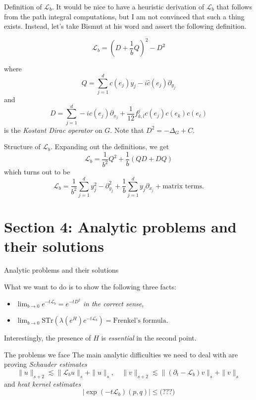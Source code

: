 \documentclass{beamer}
\numberwithin{equation}{section}
\theoremstyle{plain}
\theoremstyle{plain}
\theoremstyle{definition}
\theoremstyle{plain}
\theoremstyle{plain}
\theoremstyle{definition}
\newcommand{\Lc}{\mathcal{L}}
\newcommand{\Str}{\mathrm{STr}}
\begin{document}
\begin{frame}{Definition of $\Lc_b.$}
  It would be nice to have a heuristic derivation of $\Lc_b$ that follows from the path integral computations, but I am not convinced that such a thing exists. Instead, let's take Bismut at his word and assert the following definition.
  \begin{definition}
    \[
      \Lc_b = (D+\frac1bQ)^2-D^2
    \]
  \end{definition}
  where
  \[
    Q = \sum_{j=1}^d c(e_j)y_j-i\widehat{c}(e_j)\partial_{y_j}
  \]
  and 
  \[
    D = \sum_{j=1}^d -ic(e_j)\partial_{x_j}+\frac{1}{12}f^j_{k,l}c(e_j)c(e_k)c(e_\ell)
  \]
  is the \emph{Kostant Dirac operator} on $G.$ Note that $D^2  =-\Delta_G+C.$
\end{frame}

\begin{frame}{Structure of $\Lc_b.$}
  Expanding out the definitions, we get
  \[
    \Lc_b = \frac{1}{b^2}Q^2+\frac{1}{b}(QD+DQ)
  \]
  which turns out to be
  \[
    \Lc_b = \frac{1}{b^2}\sum_{j=1}^d y_j^2-\partial_{y_j}^2 + \frac{1}{b}\sum_{j=1}^dy_j\partial_{x_j} + \text{matrix terms.}
  \]
\end{frame}

\section{Section 4: Analytic problems and their solutions}

\begin{frame}
  \huge{Analytic problems and their solutions}
\end{frame}

\begin{frame}
  What we want to do is to show the following three facts:
  \begin{itemize}
    \item{} $\lim_{b\to 0} e^{-t\Lc_b} = e^{-tD^2}$ \emph{in the correct sense},
    \item{} $\lim_{b\to 0} \Str(\lambda(e^H)e^{-t\Lc_b}) = \text{Frenkel's formula.}$
  \end{itemize}
  Interestingly, the presence of $H$ is \emph{essential} in the second point.
\end{frame}

\begin{frame}{The problems we face}
  The main analytic difficulties we need to deal with are proving \emph{Schauder estimates}
  \[
    \|u\|_{s+2} \lesssim \|\Lc_bu\|_s+\|u\|_s,\quad \|v\|_{s+2} \lesssim \|(\partial_t-\Lc_b)v\|_s+\|v\|_s
  \]
  and \emph{heat kernel estimates}
  \[
    |\exp(-t\Lc_b)(p,q)| \leq \text{(???)}
  \]
\end{frame}
\end{document}
